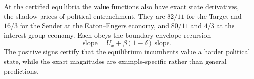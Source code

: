 At the certified equilibria the value functions also have exact state
derivatives, the shadow prices of political entrenchment. They are
$82/11$ for the Target and $16/3$ for the Sender at the
Eaton--Engers economy, and $80/11$ and $4/3$ at the interest-group
economy. Each obeys the boundary-envelope recursion
\[
\text{slope}=U_x+\beta(1-\delta)\,\text{slope}.
\]
The positive signs certify that the equilibrium incumbents value a
harder political state, while the exact magnitudes are
example-specific rather than general predictions.
